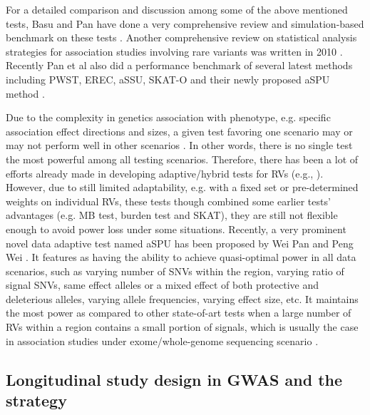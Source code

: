 \documentclass[12pt]{article}
\begin{document}
\begin{itemize}
\end{itemize}

For a detailed comparison and discussion among some of the above mentioned tests, Basu and Pan have done a very comprehensive review and simulation-based benchmark on these tests \cite{Basu2011}. Another comprehensive review on statistical analysis strategies for association studies involving rare variants was written in 2010 \cite{Bansal2010}. Recently Pan et al also did a performance benchmark of several latest methods including PWST, EREC, aSSU, SKAT-O and their newly proposed aSPU method \cite{pan2014powerful}.

Due to the complexity in genetics association with phenotype, e.g. specific association effect directions and sizes, a given test favoring one scenario may or may not perform well in other scenarios \cite{Pan2009,Derkach2013,pan2014powerful,Sun2013}. In other words, there is no single test the most powerful among all testing scenarios. Therefore, there has been a lot of efforts already made in developing adaptive/hybrid tests for RVs (e.g., \cite{Derkach2013,Chen2012,Han2010,Lee2012,Lin2011,Pan2011,Sun2013,Zhang2011}). However, due to still limited adaptability, e.g. with a fixed set or pre-determined weights on individual RVs, these tests though combined some earlier tests' advantages (e.g. MB test, burden test and SKAT), they are still not flexible enough to avoid power loss under some situations. Recently, a very prominent novel data adaptive test named aSPU has been proposed by Wei Pan and Peng Wei \cite{pan2014powerful}. It features as having the ability to achieve quasi-optimal power in all data scenarios, such as varying number of SNVs within the region, varying ratio of signal SNVs, same effect alleles or a mixed effect of both protective and deleterious alleles, varying allele frequencies, varying effect size, etc. It maintains the most power as compared to other state-of-art tests when a large number of RVs within a region contains a small portion of signals, which is usually the case in association studies under exome/whole-genome sequencing scenario \cite{pan2014powerful}.

\subsection*{Longitudinal study design in GWAS and the strategy}
\end{document}
